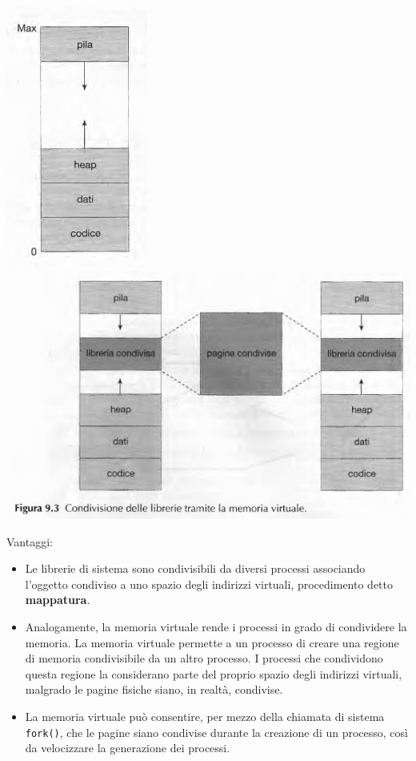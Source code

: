 \documentclass[11pt,a4paper]{article}
\begin{document}
\begin{center}
  \includegraphics[scale=0.6]{img/0041.png}\\
  \includegraphics[scale=0.6]{img/0042.png}
\end{center}
Vantaggi:
\begin{itemize}
  \item Le librerie di sistema sono condivisibili da diversi processi associando l'oggetto condi­viso a uno spazio degli indirizzi virtuali, procedimento detto \textbf{mappatura}.
  \item Analogamente, la memoria virtuale rende i processi in grado di condividere la memoria. La memoria virtuale permette a un processo di creare una regione di memoria condivisibile da un altro processo. I processi che condividono questa regione la considerano parte del proprio spazio degli indirizzi virtuali, malgra­do le pagine fisiche siano, in realtà, condivise.
  \item La memoria virtuale può consentire, per mezzo della chiamata di sistema \texttt{fork()}, che le pagine siano condivise durante la creazione di un processo, così da velocizzare la ge­nerazione dei processi.
\end{itemize}
\end{document}
